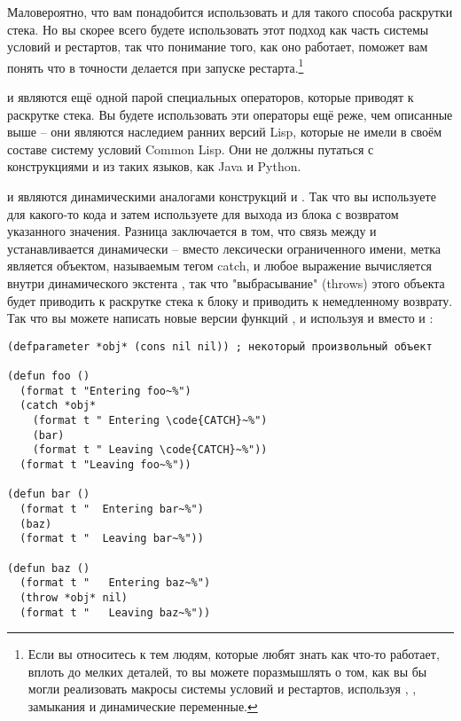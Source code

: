 Маловероятно, что вам понадобится использовать  и  для такого
способа раскрутки стека.  Но вы скорее всего будете использовать этот подход как часть
системы условий и рестартов, так что понимание того, как оно работает, поможет вам понять
что в точности делается при запуске рестарта.\footnote{Если вы относитесь к тем людям,
  которые любят знать как что-то работает, вплоть до мелких деталей, то вы можете
  поразмышлять о том, как вы бы могли реализовать макросы системы условий и рестартов,
  используя , , замыкания и динамические переменные.}

 и  являются ещё одной парой специальных операторов, которые
приводят к раскрутке стека.  Вы будете использовать эти операторы ещё реже, чем описанные
выше -- они являются наследием ранних версий Lisp, которые не имели в своём составе
систему условий Common Lisp.  Они не должны путаться с конструкциями  и
 из таких языков, как Java и Python.

 и  являются динамическими аналогами конструкций  и
.  Так что вы используете  для какого-то кода и затем
используете  для выхода из блока  с возвратом указанного значения.
Разница заключается в том, что связь между  и  устанавливается
динамически -- вместо лексически ограниченного имени, метка  является
объектом, называемым тегом catch, и любое выражение  вычисляется внутри
динамического экстента , так что "выбрасывание" (throws) этого объекта будет
приводить к раскрутке стека к блоку  и приводить к немедленному возврату.  Так
что вы можете написать новые версии функций ,  и  используя
 и  вместо  и :

\begin{lstlisting}
(defparameter *obj* (cons nil nil)) ; некоторый произвольный объект

(defun foo ()
  (format t "Entering foo~%")
  (catch *obj*
    (format t " Entering \code{CATCH}~%")
    (bar)
    (format t " Leaving \code{CATCH}~%"))
  (format t "Leaving foo~%"))

(defun bar ()
  (format t "  Entering bar~%")
  (baz)
  (format t "  Leaving bar~%"))

(defun baz ()
  (format t "   Entering baz~%")
  (throw *obj* nil)
  (format t "   Leaving baz~%"))
\end{lstlisting}

